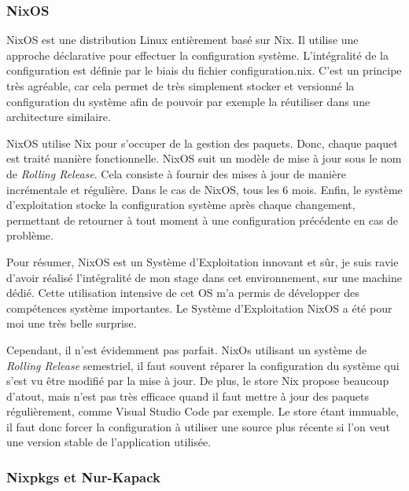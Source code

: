 \documentclass[a4paper,french,12pt, titlepage]{article}
\begin{document}
\hypertarget{nixos}{%
\subsubsection{NixOS}\label{nixos}}

NixOS est une distribution Linux entièrement basé sur Nix. Il utilise
une approche déclarative pour effectuer la configuration système.
L'intégralité de la configuration est définie par le biais du fichier
configuration.nix. C'est un principe très agréable, car cela permet de
très simplement stocker et versionné la configuration du système afin de
pouvoir par exemple la réutiliser dans une architecture
similaire.\newline

NixOS utilise Nix pour s'occuper de la gestion des paquets. Donc, chaque
paquet est traité manière fonctionnelle. NixOS suit un modèle de mise à
jour sous le nom de \emph{Rolling Release}. Cela consiste à fournir des
mises à jour de manière incrémentale et régulière. Dans le cas de NixOS,
tous les 6 mois. Enfin, le système d'exploitation stocke la
configuration système après chaque changement, permettant de retourner à
tout moment à une configuration précédente en cas de problème.\newline

Pour résumer, NixOS est un Système d'Exploitation innovant et sûr, je
suis ravie d'avoir réalisé l'intégralité de mon stage dans cet
environnement, sur une machine dédié. Cette utilisation intensive de cet
OS m'a permis de développer des compétences système importantes. Le
Système d'Exploitation NixOS a été pour moi une très belle
surprise.\newline

Cependant, il n'est évidemment pas parfait. NixOs utilisant un système
de \emph{Rolling Release} semestriel, il faut souvent réparer la
configuration du système qui s'est vu être modifié par la mise à jour.
De plus, le store Nix propose beaucoup d'atout, mais n'est pas très
efficace quand il faut mettre à jour des paquets régulièrement, comme
Visual Studio Code par exemple. Le store étant immuable, il faut donc
forcer la configuration à utiliser une source plus récente si l'on veut
une version stable de l'application utilisée.\newline

\hypertarget{nixpkgs-et-nur-kapack}{%
\subsubsection{Nixpkgs et Nur-Kapack}\label{nixpkgs-et-nur-kapack}}
\end{document}
